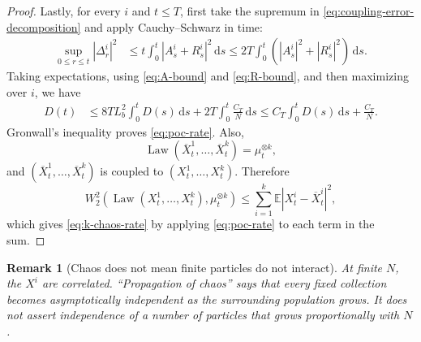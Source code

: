 \documentclass[11pt]{amsart}
\numberwithin{equation}{section}
\theoremstyle{plain}
\newtheorem{remark}[theorem]{Remark}
\newcommand{\E}{\mathbb{E}}
\newcommand{\dd}{\,\mathrm{d}}
\newcommand{\abs}[1]{\left\lvert#1\right\rvert}
\DeclareMathOperator{\Law}{Law}
\begin{document}
\begin{proof}
Lastly, for every $i$ and $t\leq T$, first take the supremum in
\eqref{eq:coupling-error-decomposition} and apply Cauchy--Schwarz in time:
\begin{align*}
 \sup_{0\leq r\leq t}\abs{\Delta_r^i}^2
 &\leq t\int_0^t\abs{A_s^i+R_s^i}^2\dd s \leq2T\int_0^t\left(\abs{A_s^i}^2+
       \abs{R_s^i}^2\right)\dd s.
\end{align*}
Taking expectations, using \eqref{eq:A-bound} and \eqref{eq:R-bound}, and then maximizing over $i$, we have 
\begin{align*}
 D(t)
 &\leq8TL_b^2\int_0^tD(s)\dd s
   +2T\int_0^t\frac{C_T}{N}\dd s \leq C_T\int_0^tD(s)\dd s+\frac{C_T}{N}.
\end{align*}
Gronwall's inequality proves \eqref{eq:poc-rate}.  Also,
\[
 \Law(\overline X_t^1,\ldots,\overline X_t^k)=\mu_t^{\otimes k},
\]
and $(\overline X_t^1,\ldots,\overline X_t^k)$ is coupled to
$(X_t^1,\ldots,X_t^k)$.  Therefore
\[
 W_2^2\left(\Law(X_t^1,\ldots,X_t^k),\mu_t^{\otimes k}\right)
 \leq\sum_{i=1}^k\E\abs{X_t^i-\overline X_t^i}^2,
\]
which gives \eqref{eq:k-chaos-rate} by applying \eqref{eq:poc-rate} to each term in the sum.
\end{proof}

\begin{remark}[Chaos does not mean finite particles do not interact]
At finite $N$, the $X^i$ are correlated.  ``Propagation of chaos'' says that
every fixed collection becomes asymptotically independent as the surrounding
population grows.  It does not assert independence of a number of particles
that grows proportionally with $N$.
\end{remark}
\end{document}

